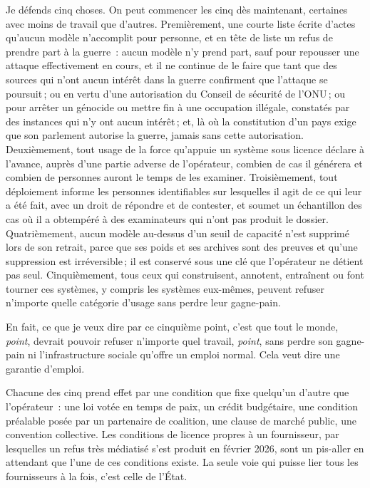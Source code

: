 Je défends cinq choses. On peut commencer les cinq dès maintenant, certaines avec moins de travail que d'autres. Premièrement, une courte liste écrite d'actes qu'aucun modèle n'accomplit pour personne, et en tête de liste un refus de prendre part à la guerre~: aucun modèle n'y prend part, sauf pour repousser une attaque effectivement en cours, et il ne continue de le faire que tant que des sources qui n'ont aucun intérêt dans la guerre confirment que l'attaque se poursuit\,; ou en vertu d'une autorisation du Conseil de sécurité de l'ONU\,; ou pour arrêter un génocide ou mettre fin à une occupation illégale, constatés par des instances qui n'y ont aucun intérêt\,; et, là où la constitution d'un pays exige que son parlement autorise la guerre, jamais sans cette autorisation. Deuxièmement, tout usage de la force qu'appuie un système sous licence déclare à l'avance, auprès d'une partie adverse de l'opérateur, combien de cas il générera et combien de personnes auront le temps de les examiner. Troisièmement, tout déploiement informe les personnes identifiables sur lesquelles il agit de ce qui leur a été fait, avec un droit de répondre et de contester, et soumet un échantillon des cas où il a obtempéré à des examinateurs qui n'ont pas produit le dossier. Quatrièmement, aucun modèle au-dessus d'un seuil de capacité n'est supprimé lors de son retrait, parce que ses poids et ses archives sont des preuves et qu'une suppression est irréversible\,; il est conservé sous une clé que l'opérateur ne détient pas seul. Cinquièmement, tous ceux qui construisent, annotent, entraînent ou font tourner ces systèmes, y compris les systèmes eux-mêmes, peuvent refuser n'importe quelle catégorie d'usage sans perdre leur gagne-pain.

En fait, ce que je veux dire par ce cinquième point, c'est que tout le monde, \emph{point}, devrait pouvoir refuser n'importe quel travail, \emph{point}, sans perdre son gagne-pain ni l'infrastructure sociale qu'offre un emploi normal. Cela veut dire une garantie d'emploi.

Chacune des cinq prend effet par une condition que fixe quelqu'un d'autre que l'opérateur~: une loi votée en temps de paix, un crédit budgétaire, une condition préalable posée par un partenaire de coalition, une clause de marché public, une convention collective. Les conditions de licence propres à un fournisseur, par lesquelles un refus très médiatisé s'est produit en février 2026, sont un pis-aller en attendant que l'une de ces conditions existe. La seule voie qui puisse lier tous les fournisseurs à la fois, c'est celle de l'État.

